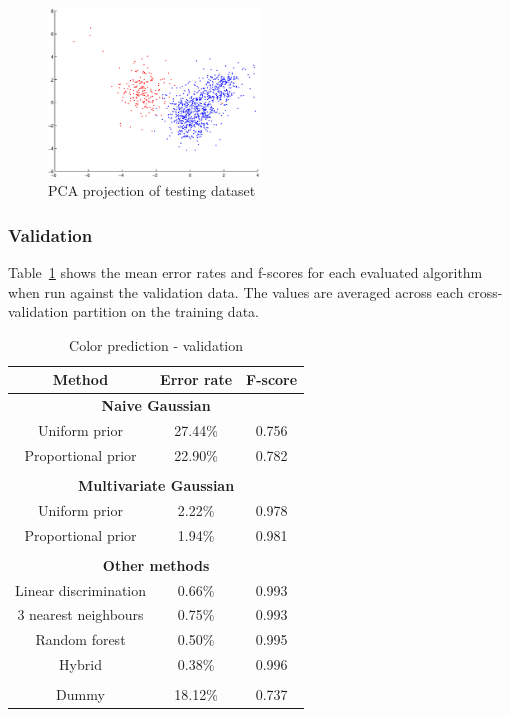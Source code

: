 \documentclass[twoside]{article}
\begin{document}
\begin{multicols}{2}
\begin{figure}[H]
\centering
\includegraphics[width=0.5\textwidth]{testpca}
\caption{PCA projection of testing dataset}
\label{fig:color_testing_pca}
\end{figure}

\subsubsection{Validation}

Table~\ref{table:color_validation} shows the mean error rates and f-scores for each evaluated algorithm when run against the validation data. The values are averaged across each
cross-validation partition on the training data.

\begin{table}[H]
\caption{Color prediction - validation}
\label{table:color_validation}
\begin{tabular}{ccc}
\textbf{Method} & \textbf{Error rate} & \textbf{F-score}\\
\midrule
\multicolumn{3}{c}{\textbf{Naive Gaussian}} \\
Uniform prior & 27.44\% & 0.756 \\
Proportional prior & 22.90\% & 0.782 \\
\\
\multicolumn{3}{c}{\textbf{Multivariate Gaussian}} \\
Uniform prior & 2.22\% & 0.978 \\
Proportional prior & 1.94\% & 0.981 \\
\\
\multicolumn{3}{c}{\textbf{Other methods}} \\
Linear discrimination & 0.66\% & 0.993 \\
$3$ nearest neighbours & 0.75\% & 0.993 \\
Random forest & 0.50\% & 0.995 \\
Hybrid & 0.38\% & 0.996 \\
\\
Dummy & 18.12\% & 0.737 \\
\end{tabular}
\end{table}


\end{multicols}
\end{document}
